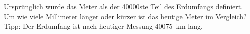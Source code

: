 \begin{aufgabe}
	Ursprünglich wurde das Meter als der \num{40000}ste Teil des Erdumfangs definiert.
	Um wie viele Millimeter länger oder kürzer ist das heutige Meter im Vergleich?
	Tipp: Der Erdumfang ist nach heutiger Messung \SI{40075}{km} lang.
\end{aufgabe}
